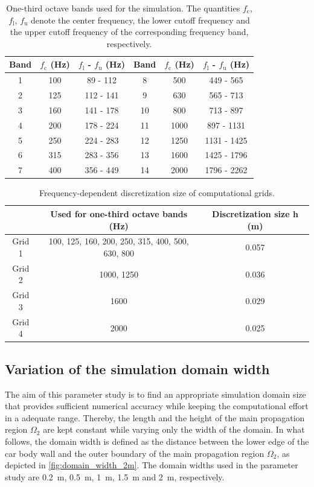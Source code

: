 \begin{table}
	\centering
	\caption{One-third octave bands used for the simulation. The quantities $f_{\text{c}}$, $f_{\text{l}}$, $f_{\text{u}}$ denote the center frequency, the lower cutoff frequency and the upper cutoff frequency of the corresponding frequency band, respectively.}
	\label{tab:third_octave_bands_used}
	\begin{tabular}{cccccc}
		\toprule
		Band & $f_{\text{c}}$ (Hz) & $f_{\text{l}}$ - $f_{\text{u}}$ (Hz) & Band & $f_{\text{c}}$ (Hz) & $f_{\text{l}}$ - $f_{\text{u}}$ (Hz) \\
		\midrule
		1 & 100 & 89 - 112 & 8 & 500 & 449 - 565 \\
		2 & 125 & 112 - 141 & 9 & 630 & 565 - 713 \\
		3 & 160 & 141 - 178 & 10 & 800 & 713 - 897 \\
		4 & 200 & 178 - 224 & 11 & 1000 & 897 - 1131 \\
		5 & 250 & 224 - 283 & 12 & 1250 & 1131 - 1425 \\
		6 & 315 & 283 - 356 & 13 & 1600 & 1425 - 1796 \\
		7 & 400 & 356 - 449 & 14 & 2000 & 1796 - 2262 \\
		\bottomrule
	\end{tabular}
\end{table}


\begin{table}
	\centering
	\caption{Frequency-dependent discretization size of computational grids.}
	\label{tab:grid_size}
	\begin{tabular}{ccc}
		\toprule
			& Used for one-third octave bands (Hz) & Discretization size h (m) \\
		\midrule
		Grid 1 & 100, 125, 160, 200, 250, 315, 400, 500, 630, 800 & 0.057 \\
		Grid 2 & 1000, 1250 & 0.036 \\
		Grid 3 & 1600 & 0.029 \\
		Grid 4 & 2000 & 0.025 \\
		\bottomrule
	\end{tabular}
\end{table}


\subsection*{Variation of the simulation domain width}

The aim of this parameter study is to find an appropriate simulation domain size that provides sufficient numerical accuracy while keeping the computational effort in a adequate range. Thereby, the length and the height of the main propagation region $\Omega_2$ are kept constant while varying only the width of the domain. In what follows, the domain width is defined as the distance between the lower edge of the car body wall and the outer boundary of the main propagation region $\Omega_2$, as depicted in \cref{fig:domain_width_2m}. The domain widths used in the parameter study are \SI{0.2}{\meter}, \SI{0.5}{\meter}, \SI{1}{\meter}, \SI{1.5}{\meter} and \SI{2}{\meter}, respectively. 

